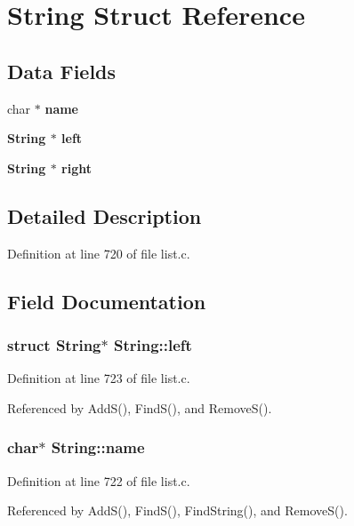 \section{String Struct Reference}
\label{structString}
\subsection*{Data Fields}
\begin{CompactItemize}
\item 
char $\ast$ \bf{name}
\item 
\bf{String} $\ast$ \bf{left}
\item 
\bf{String} $\ast$ \bf{right}
\end{CompactItemize}


\subsection{Detailed Description}




Definition at line 720 of file list.c.

\subsection{Field Documentation}
\subsubsection{\setlength{\rightskip}{0pt plus 5cm}struct \bf{String}$\ast$ \bf{String::left}}\label{structString_70e75a236eb9b90d06b48c6b94b33e20}




Definition at line 723 of file list.c.

Referenced by Add\-S(), Find\-S(), and Remove\-S().
\subsubsection{\setlength{\rightskip}{0pt plus 5cm}char$\ast$ \bf{String::name}}\label{structString_cf435f220b3de762d52cdb750062f623}




Definition at line 722 of file list.c.

Referenced by Add\-S(), Find\-S(), Find\-String(), and Remove\-S().
